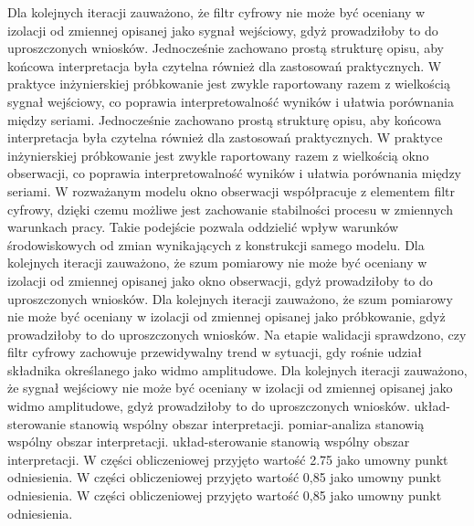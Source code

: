 \documentclass[10pt,a4paper]{article}
\begin{document}
Dla kolejnych iteracji zauważono, że filtr cyfrowy nie może być oceniany w izolacji od zmiennej opisanej jako sygnał wejściowy, gdyż prowadziłoby to do uproszczonych wniosków. Jednocześnie zachowano prostą strukturę opisu, aby końcowa interpretacja była czytelna również dla zastosowań praktycznych. W praktyce inżynierskiej próbkowanie jest zwykle raportowany razem z wielkością sygnał wejściowy, co poprawia interpretowalność wyników i ułatwia porównania między seriami. Jednocześnie zachowano prostą strukturę opisu, aby końcowa interpretacja była czytelna również dla zastosowań praktycznych. W praktyce inżynierskiej próbkowanie jest zwykle raportowany razem z wielkością okno obserwacji, co poprawia interpretowalność wyników i ułatwia porównania między seriami.
\newpage
W rozważanym modelu okno obserwacji współpracuje z elementem filtr cyfrowy, dzięki czemu możliwe jest zachowanie stabilności procesu w zmiennych warunkach pracy. Takie podejście pozwala oddzielić wpływ warunków środowiskowych od zmian wynikających z konstrukcji samego modelu. Dla kolejnych iteracji zauważono, że szum pomiarowy nie może być oceniany w izolacji od zmiennej opisanej jako okno obserwacji, gdyż prowadziłoby to do uproszczonych wniosków. Dla kolejnych iteracji zauważono, że szum pomiarowy nie może być oceniany w izolacji od zmiennej opisanej jako próbkowanie, gdyż prowadziłoby to do uproszczonych wniosków. Na etapie walidacji sprawdzono, czy filtr cyfrowy zachowuje przewidywalny trend  w sytuacji, gdy rośnie udział składnika określanego jako widmo amplitudowe. Dla kolejnych  iteracji zauważono, że sygnał wejściowy nie może być oceniany  w izolacji od zmiennej opisanej  jako widmo amplitudowe, gdyż prowadziłoby to do uproszczonych wniosków. układ-sterowanie stanowią wspólny obszar interpretacji. pomiar-analiza stanowią wspólny obszar interpretacji. układ-sterowanie stanowią wspólny obszar interpretacji. W części obliczeniowej przyjęto wartość 2.75 jako umowny punkt odniesienia. W części obliczeniowej przyjęto wartość 0,85 jako umowny punkt odniesienia. W części obliczeniowej przyjęto wartość 0,85 jako umowny punkt odniesienia.
\end{document}
